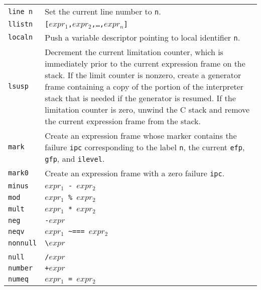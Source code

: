 \begin{supertabular}{l@{\hspace{1.5cm}}p{13.5cm}}
\texttt{line n}  & Set the current line number to \texttt{n}.\\

\texttt{llistn } & \texttt{[$expr_1$,$expr_2$,\dots,$expr_n$]}\\

\texttt{localn } & Push a variable descriptor pointing to local identifier \texttt{n}.\\

\texttt{lsusp}   & Decrement the current limitation counter, which is
immediately prior to the current expression frame on the stack. If the
limit counter is nonzero, create a generator frame containing a copy
of the portion of the interpreter stack that is needed if the
generator is resumed. If the limitation counter is zero, unwind the C
stack and remove the current expression frame from the stack.\\

\texttt{mark}    & Create an expression frame whose marker contains the failure
\texttt{ipc} corresponding to the label \texttt{n}, the current \texttt{efp},
\texttt{gfp}, and \texttt{ilevel}.\\


\texttt{mark0}   & Create an expression frame with a zero failure \texttt{ipc}.\\

\texttt{minus}   & \texttt{$expr_1$ - $expr_2$}\\

\texttt{mod}     & \texttt{$expr_1$ \% $expr_2$}\\

\texttt{mult}    & \texttt{$expr_1$ * $expr_2$}\\

\texttt{neg}     & \texttt{{}-$expr$}\\

\texttt{neqv}    & \texttt{$expr_1$ \textasciitilde=== $expr_2$}\\

\texttt{nonnull} & \texttt{{\textbackslash}$expr$}\\

\\

\texttt{null}    &\texttt{/$expr$}\\

\texttt{number}  & \texttt{+$expr$}\\

\texttt{numeq}   & \texttt{$expr_1$ = $expr_2$}\\


\end{supertabular}
